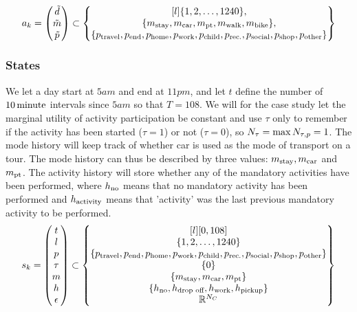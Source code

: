 \begin{equation} 
a_k = \begin{pmatrix}
\act{d} \\
\act{m} \\
\act{p}    
\end{pmatrix}
\subset
\begin{Bmatrix*}[l]
\{1,2,\dots, 1240\}, \\
\{m_{\text{stay}},\m{car},\m{pt},\m{walk},\m{bike}\}, \\
\{ p_{\text{travel}},p_{\text{end}},\p{home},\p{work},\p{child},\p{rec.},\p{social},\p{shop},\p{other}\} 
\end{Bmatrix*}
\end{equation}
\subsubsection{States}
We let a day start at $5\unit{am}$ and end at $11\unit{pm}$, and let $t$ define the number of $10\, \mathrm{minute}$ intervals since $5\unit{am}$ so that $T=108$.
We will for the case study let the marginal utility of activity participation be constant and use $\tau$ only to remember if the activity has been started ($\tau=1$) or not ($\tau=0$), so $N_\tau=\max{N_{\tau,p}}=1$. The mode history will keep track of whether car is used as the mode of transport on a tour. The mode history can thus be described by three values: $m_{\text{stay}},m_{\text{car}}$ and $m_{\text{pt}}$. The activity history will store whether any of the mandatory activities have been performed, where $h_\text{no}$ means that no mandatory activity has been performed and $h_\text{activity}$ means that 'activity' was the last previous mandatory activity to be performed. 
\begin{equation}
\s{k} = \begin{pmatrix}
t \\
l \\
p \\
\atime\\
m \\
\amem \\
\epsilon
\end{pmatrix}
\subset
\begin{Bmatrix*}[l]
[0,108] \\
\{1,2,\dots, 1240\} \\
\{ p_{\text{travel}},p_{\text{end}},\p{home},\p{work},\p{child},\p{rec.},\p{social},\p{shop},\p{other}\}  \\
\{0\} \\
\{m_{\text{stay}},\m{car},\m{pt} \}\\
\{\amemm{no},\amemm{drop off}, \amemm{work},\amemm{pickup}\}\\
\rr^{N_C}
\end{Bmatrix*}
\end{equation}

